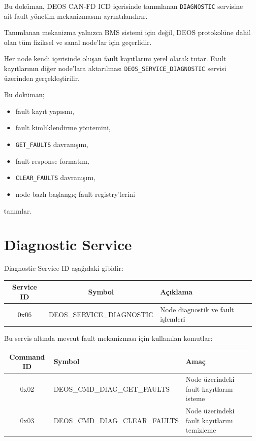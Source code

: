 \documentclass[a4paper,11pt]{article}
\begin{document}
Bu doküman, DEOS CAN-FD ICD içerisinde tanımlanan
\texttt{DIAGNOSTIC} servisine ait fault yönetim mekanizmasını
ayrıntılandırır.

Tanımlanan mekanizma yalnızca BMS sistemi için değil,
DEOS protokolüne dahil olan tüm fiziksel ve sanal node'lar için
geçerlidir.

Her node kendi içerisinde oluşan fault kayıtlarını yerel olarak tutar.
Fault kayıtlarının diğer node'lara aktarılması
\texttt{DEOS\_SERVICE\_DIAGNOSTIC} servisi üzerinden gerçekleştirilir.

Bu doküman;

\begin{itemize}
    \item fault kayıt yapısını,
    \item fault kimliklendirme yöntemini,
    \item \texttt{GET\_FAULTS} davranışını,
    \item fault response formatını,
    \item \texttt{CLEAR\_FAULTS} davranışını,
    \item node bazlı başlangıç fault registry'lerini
\end{itemize}

tanımlar.

\section{Diagnostic Service}

Diagnostic Service ID aşağıdaki gibidir:

\begin{center}
\begin{tabular}{c c l}
\toprule
\textbf{Service ID} & \textbf{Symbol} & \textbf{Açıklama} \\
\midrule
0x06 & DEOS\_SERVICE\_DIAGNOSTIC & Node diagnostik ve fault işlemleri \\
\bottomrule
\end{tabular}
\end{center}

Bu servis altında mevcut fault mekanizması için kullanılan komutlar:

\begin{center}
\begin{tabular}{c l l}
\toprule
\textbf{Command ID} & \textbf{Symbol} & \textbf{Amaç} \\
\midrule
0x02 & DEOS\_CMD\_DIAG\_GET\_FAULTS   & Node üzerindeki fault kayıtlarını isteme \\
0x03 & DEOS\_CMD\_DIAG\_CLEAR\_FAULTS & Node üzerindeki fault kayıtlarını temizleme \\
\bottomrule
\end{tabular}
\end{center}
\end{document}
